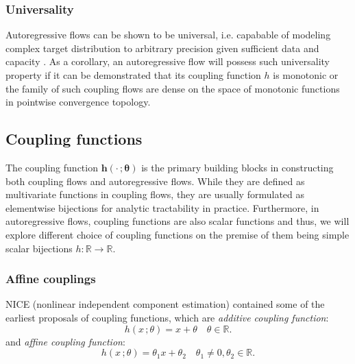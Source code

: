 \subsubsection{Universality}

Autoregressive flows can be shown to be universal, i.e. capabable of modeling
complex target distribution to arbitrary precision given sufficient data and
capacity \cite{jainiSumofSquaresPolynomialFlow2019}
\cite{huangNeuralAutoregressiveFlows2018}. As a corollary, an autoregressive
flow will possess such universality property if it can be demonstrated that
its
coupling function $h$ is monotonic or the family of such coupling flows are
dense on the space of monotonic functions in pointwise convergence
topology.
\subsection{Coupling functions}


The coupling function $\mathbf{h}(\cdot\,;\mathbf{\theta})$ is the primary
building blocks in constructing both coupling flows and autoregressive flows.
While they are defined as multivariate functions in coupling flows, they are
usually formulated as elementwise bijections for analytic tractability in
practice. Furthermore, in autoregressive flows, coupling functions are also
scalar functions and thus, we will explore different choice of coupling
functions on the premise of them being simple scalar bijections $h: \mathbb{R} \to
\mathbb{R}$.

\subsubsection{Affine couplings}

NICE (nonlinear independent component estimation)
\cite{dinhNICENonlinearIndependent2015} contained some of the earliest proposals
of coupling functions, which are \textit{additive coupling function}:
$$
h(x\,;\theta) = x + \theta \quad \theta \in  \mathbb{R}
.$$
and \textit{affine coupling function}:
$$
h(x\,;\theta) = \theta_1 x + \theta_2 \quad \theta_1 \neq 0,
\theta_2 \in  \mathbb{R}
.$$


